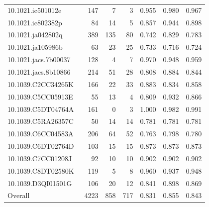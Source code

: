 \begin{table}[t]
{\begin{tabular}{lrrrrrr}
10.1021.ic501012e~\cite{tan_two_2014}                          & 147 &  7 &  3 & 0.955 & 0.980 & 0.967 \\
10.1021.ic802382p~\cite{prakash_metalorganic_2009}             &  84 & 14 &  5 & 0.857 & 0.944 & 0.898 \\
10.1021.ja042802q~\cite{sudik_design_2005}                     & 389 &135 & 80 & 0.742 & 0.829 & 0.783 \\
10.1021.ja105986b~\cite{zheng_cubic_2010}                      &  63 & 23 & 25 & 0.733 & 0.716 & 0.724 \\
10.1021.jacs.7b00037~\cite{zhang_controlled_2017}              & 128 &  4 &  7 & 0.970 & 0.948 & 0.959 \\
10.1021.jacs.8b10866~\cite{zhang_self-assembly_2018}           & 214 & 51 & 28 & 0.808 & 0.884 & 0.844 \\
10.1039.C2CC34265K~\cite{du_giant_2012}                        & 166 & 22 & 33 & 0.883 & 0.834 & 0.858 \\
10.1039.C5CC05913E~\cite{augustyniak_vanadium_2015}            &  55 & 13 &  4 & 0.809 & 0.932 & 0.866 \\
10.1039.C5DT04764A~\cite{zhang_polyoxovanadate-based_2016}     & 161 &  0 &  3 & 1.000 & 0.982 & 0.991 \\
10.1039.C5RA26357C~\cite{chen_synthesis_2016}                  &  50 & 14 & 14 & 0.781 & 0.781 & 0.781 \\
10.1039.C6CC04583A~\cite{zhang_anderson-like_2016}             & 206 & 64 & 52 & 0.763 & 0.798 & 0.780 \\
10.1039.C6DT02764D~\cite{zhang_synthesis_2016}                 & 103 & 15 & 15 & 0.873 & 0.873 & 0.873 \\
10.1039.C7CC01208J~\cite{zhang_self-assembly_2017}             &  92 & 10 & 10 & 0.902 & 0.902 & 0.902 \\
10.1039.C8DT02580K~\cite{gong_functionalized_2018}             & 119 &  5 &  8 & 0.960 & 0.937 & 0.948 \\
10.1039.D3QI01501G~\cite{yang_efficient_2023}                  & 106 & 20 & 12 & 0.841 & 0.898 & 0.869 \\
\hline
Overall                                                         & 4223 & 858 & 717 & 0.831 & 0.855 & 0.843 \\
\hline
\end{tabular}
}
\end{table}



